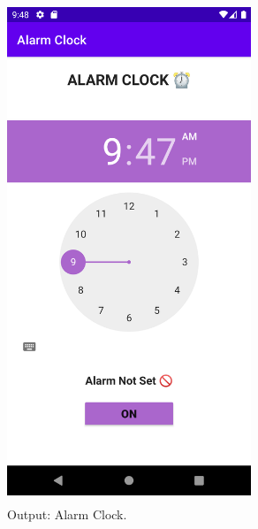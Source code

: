 \documentclass[12pt, a4]{article}
\begin{document}
\newpage
\subsection*{}
\begin{flushleft}

\end{flushleft}

\newpage
\subsection*{}
\begin{flushleft}

\end{flushleft}

\newpage
\subsection*{}
\begin{figure}[h]
\centering
\caption{Output: Alarm Clock.}
\includegraphics[height=15cm, width=7.3cm]{AlarmClock/Screenshots/Output-1.png}
\end{figure}
\end{document}

